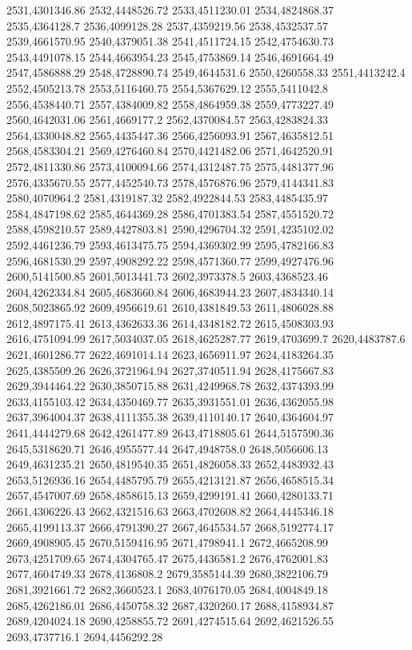 2531,4301346.86
2532,4448526.72
2533,4511230.01
2534,4824868.37
2535,4364128.7
2536,4099128.28
2537,4359219.56
2538,4532537.57
2539,4661570.95
2540,4379051.38
2541,4511724.15
2542,4754630.73
2543,4491078.15
2544,4663954.23
2545,4753869.14
2546,4691664.49
2547,4586888.29
2548,4728890.74
2549,4644531.6
2550,4260558.33
2551,4413242.4
2552,4505213.78
2553,5116460.75
2554,5367629.12
2555,5411042.8
2556,4538440.71
2557,4384009.82
2558,4864959.38
2559,4773227.49
2560,4642031.06
2561,4669177.2
2562,4370084.57
2563,4283824.33
2564,4330048.82
2565,4435447.36
2566,4256093.91
2567,4635812.51
2568,4583304.21
2569,4276460.84
2570,4421482.06
2571,4642520.91
2572,4811330.86
2573,4100094.66
2574,4312487.75
2575,4481377.96
2576,4335670.55
2577,4452540.73
2578,4576876.96
2579,4144341.83
2580,4070964.2
2581,4319187.32
2582,4922844.53
2583,4485435.97
2584,4847198.62
2585,4644369.28
2586,4701383.54
2587,4551520.72
2588,4598210.57
2589,4427803.81
2590,4296704.32
2591,4235102.02
2592,4461236.79
2593,4613475.75
2594,4369302.99
2595,4782166.83
2596,4681530.29
2597,4908292.22
2598,4571360.77
2599,4927476.96
2600,5141500.85
2601,5013441.73
2602,3973378.5
2603,4368523.46
2604,4262334.84
2605,4683660.84
2606,4683944.23
2607,4834340.14
2608,5023865.92
2609,4956619.61
2610,4381849.53
2611,4806028.88
2612,4897175.41
2613,4362633.36
2614,4348182.72
2615,4508303.93
2616,4751094.99
2617,5034037.05
2618,4625287.77
2619,4703699.7
2620,4483787.6
2621,4601286.77
2622,4691014.14
2623,4656911.97
2624,4183264.35
2625,4385509.26
2626,3721964.94
2627,3740511.94
2628,4175667.83
2629,3944464.22
2630,3850715.88
2631,4249968.78
2632,4374393.99
2633,4155103.42
2634,4350469.77
2635,3931551.01
2636,4362055.98
2637,3964004.37
2638,4111355.38
2639,4110140.17
2640,4364604.97
2641,4444279.68
2642,4261477.89
2643,4718805.61
2644,5157590.36
2645,5318620.71
2646,4955577.44
2647,4948758.0
2648,5056606.13
2649,4631235.21
2650,4819540.35
2651,4826058.33
2652,4483932.43
2653,5126936.16
2654,4485795.79
2655,4213121.87
2656,4658515.34
2657,4547007.69
2658,4858615.13
2659,4299191.41
2660,4280133.71
2661,4306226.43
2662,4321516.63
2663,4702608.82
2664,4445346.18
2665,4199113.37
2666,4791390.27
2667,4645534.57
2668,5192774.17
2669,4908905.45
2670,5159416.95
2671,4798941.1
2672,4665208.99
2673,4251709.65
2674,4304765.47
2675,4436581.2
2676,4762001.83
2677,4604749.33
2678,4136808.2
2679,3585144.39
2680,3822106.79
2681,3921661.72
2682,3660523.1
2683,4076170.05
2684,4004849.18
2685,4262186.01
2686,4450758.32
2687,4320260.17
2688,4158934.87
2689,4204024.18
2690,4258855.72
2691,4274515.64
2692,4621526.55
2693,4737716.1
2694,4456292.28
